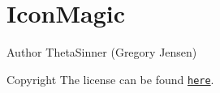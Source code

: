 \hypertarget{license_license_section}{}\section{Icon\+Magic}\label{license_license_section}
\begin{DoxyAuthor}{Author}
Theta\+Sinner (Gregory Jensen) 
\end{DoxyAuthor}
\begin{DoxyCopyright}{Copyright}
The license can be found \href{https://github.com/ThetaSinner/IconMagic/blob/master/LICENSE}{\tt here}. 
\end{DoxyCopyright}
